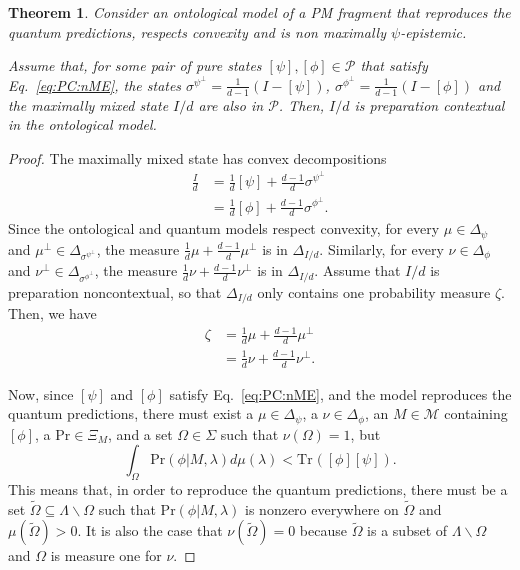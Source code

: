 \documentclass[DIV=calc,fontsize=12pt]{scrartcl} %
\theoremstyle{definition}
\theoremstyle{plain}
\newtheorem{theorem}[definition]{Theorem}
\newcommand{\Proj}[1]{\ensuremath{\left [ #1 \right ]}}
\newcommand{\Tr}[2][]{\ensuremath{\text{Tr}_{#1} \left ( #2 \right )}}
\begin{document}
\begin{theorem}
\label{prop:PC:PC}
Consider an ontological model of a PM fragment that reproduces the
quantum predictions, respects convexity and is non maximally
$\psi$-epistemic.

Assume that, for some pair of pure states $\Proj{\psi}, \Proj{\phi}
\in \mathcal{P}$ that satisfy Eq.~\eqref{eq:PC:nME}, the states
$\sigma^{\psi^{\perp}} = \frac{1}{d-1} \left ( I - \Proj{\psi}
\right )$, $\sigma^{\phi^{\perp}} = \frac{1}{d-1} \left ( I -
\Proj{\phi} \right )$ and the maximally mixed state $I/d$ are also
in $\mathcal{P}$.  Then, $I/d$ is preparation contextual in the
ontological model.
\end{theorem}
\begin{proof}
The maximally mixed state has convex decompositions
\begin{align}
\frac{I}{d} & = \frac{1}{d} \Proj{\psi} + \frac{d-1}{d}
\sigma^{\psi^{\perp}} \\
& = \frac{1}{d} \Proj{\phi} + \frac{d-1}{d} \sigma^{\phi^{\perp}}.
\end{align}
Since the ontological and quantum models respect convexity, for
every $\mu \in \Delta_{\psi}$ and $\mu^{\perp} \in
\Delta_{\sigma^{\psi^{\perp}}}$, the measure $\frac{1}{d} \mu +
\frac{d-1}{d}\mu^{\perp}$ is in $\Delta_{I/d}$.  Similarly, for
every $\nu \in \Delta_{\phi}$ and $\nu^{\perp} \in
\Delta_{\sigma^{\phi^{\perp}}}$, the measure $\frac{1}{d} \nu +
\frac{d-1}{d}\nu^{\perp}$ is in $\Delta_{I/d}$.  Assume that $I/d$
is preparation noncontextual, so that $\Delta_{I/d}$ only contains
one probability measure $\zeta$.  Then, we have
\begin{align}
\zeta & = \frac{1}{d} \mu + \frac{d-1}{d} \mu^{\perp} \\
& = \frac{1}{d} \nu + \frac{d-1}{d} \nu^{\perp}.
\end{align}

Now, since $\Proj{\psi}$ and $\Proj{\phi}$ satisfy
Eq.~\eqref{eq:PC:nME}, and the model reproduces the quantum
predictions, there must exist a $\mu \in \Delta_{\psi}$, a $\nu \in
\Delta_{\phi}$, an $M \in \mathcal{M}$ containing $\Proj{\phi}$, a
$\text{Pr} \in \Xi_M$, and a set $\Omega \in \Sigma$ such that
$\nu(\Omega) = 1$, but
\begin{equation}
\int_{\Omega} \text{Pr}(\phi|M,\lambda) d\mu(\lambda) <
\Tr{\Proj{\phi}\Proj{\psi}}.
\end{equation}
This means that, in order to reproduce the quantum predictions,
there must be a set $\tilde{\Omega} \subseteq \Lambda \backslash
\Omega$ such that $\text{Pr}(\phi|M,\lambda)$ is nonzero everywhere on
$\tilde{\Omega}$ and $\mu(\tilde{\Omega}) > 0$.  It is also the case
that $\nu(\tilde{\Omega}) = 0$ because $\tilde{\Omega}$ is a subset
of $\Lambda \backslash \Omega$ and $\Omega$ is measure one for
$\nu$.


\end{proof}
\end{document}
